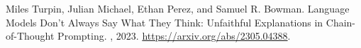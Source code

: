 \documentclass{article}
\begin{document}
\begin{thebibliography}{12}
Miles Turpin, Julian Michael, Ethan Perez, and Samuel R. Bowman.
\newblock Language Models Don't Always Say What They Think: Unfaithful Explanations in Chain-of-Thought Prompting.
, 2023.
\newblock \url{https://arxiv.org/abs/2305.04388}.

\end{thebibliography}
\end{document}
